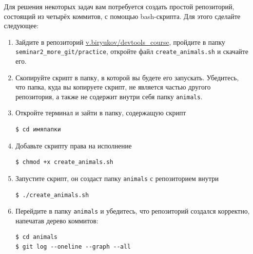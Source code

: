 \documentclass{article}
\begin{document}
\begin{minipage}{0.65\linewidth}
Для решения некоторых задач вам потребуется создать простой репозиторий, состоящий из четырёх коммитов, с помощью bash-скрипта. Для этого сделайте следующее:
\begin{enumerate}
\item Зайдите в репозиторий \href{https://mipt-hsse.gitlab.yandexcloud.net/v.biryukov/devtools_course}{v.biryukov/devtools\_course}, пройдите в папку
\texttt{seminar2\_more\_git/practice}, откройте файл \texttt{create\_animals.sh} и скачайте его.

\item Скопируйте скрипт в папку, в которой вы будете его запускать. Убедитесь, что папка, куда вы копируете скрипт, не является частью другого репозитория, а также не содержит внутри себя папку \texttt{animals}.

\item Откройте терминал и зайти в папку, содержащую скрипт
\begin{lstlisting}
$ cd имяпапки
\end{lstlisting}

\item Добавьте скрипту права на исполнение
\begin{lstlisting}[style=csMiptBash]
$ chmod +x create_animals.sh
\end{lstlisting}

\item Запустите скрипт, он создаст папку \texttt{animals} с репозиторием внутри
\begin{lstlisting}[style=csMiptBash]
$ ./create_animals.sh
\end{lstlisting}

\item Перейдите в папку \texttt{animals} и убедитесь, что репозиторий создался корректно, напечатав дерево коммитов:
\begin{lstlisting}[style=csMiptBash]
$ cd animals
$ git log --oneline --graph --all
\end{lstlisting}
\end{enumerate}
\end{minipage}
\hspace{1cm}
\end{document}
